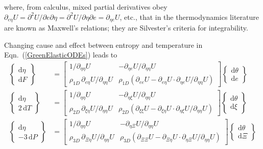 where, from calculus, mixed partial derivatives obey $\partial_{e\eta} U = \partial^2 U / \partial e \partial \eta = \partial^2 U / \partial \eta \partial e = \partial_{\eta e} U$, etc., that in the thermo\-dynamics literature are known as Maxwell's relations; they are Silvester's criteria for integrability.

Changing cause and effect between entropy and temperature in Eqn.~(\ref{GreenElasticODEs}) leads to
\begin{subequations}
    \label{HelmholtzElasticODEs}
    \begin{align}
    \left\{ \begin{matrix} \mathrm{d} \eta \\ 
    \mathrm{d} F \end{matrix} \right\} & = \begin{bmatrix}
    1/\partial_{\eta\eta} U & -\partial_{\eta e} U / 
    \partial_{\eta\eta} U \\
    \rho_{1D} \, \partial_{e\eta} U / \partial_{\eta\eta} U & \rho_{1D} ( \partial_{ee} U - \partial_{e\eta} U \!\cdot\! \partial_{\eta e} U / \partial_{\eta\eta} U ) \end{bmatrix} 
    \left\{ \begin{matrix} \mathrm{d} \theta \\
    \mathrm{d} e \end{matrix} \right\} \\
    \left\{ \begin{matrix} \mathrm{d} \eta \\ 
    2 \, \mathrm{d} T \end{matrix} \right\} & = \begin{bmatrix}
    1/\partial_{\eta\eta} U & -\partial_{\eta \xi} U / \partial_{\eta\eta} U \\
    \rho_{2D} \, \partial_{\xi\eta} U / \partial_{\eta\eta} U & \rho_{2D} ( \partial_{\xi\xi} U - \partial_{\xi\eta} U \!\cdot\! \partial_{\eta\xi} U / \partial_{\eta\eta} U ) \end{bmatrix} \left\{ \begin{matrix} \mathrm{d} \theta \\
    \mathrm{d} \xi \end{matrix} \right\} \label{HelmholtzMembrane} \\
    \left\{ \begin{matrix} \mathrm{d} \eta \\ 
    -3 \, \mathrm{d} P \end{matrix} \right\} & = \begin{bmatrix}
    1/\partial_{\eta\eta} U & -\partial_{\eta \Xi} U / \partial_{\eta\eta} U \\
    \rho_{3D} \, \partial_{\Xi\eta} U / \partial_{\eta\eta} U & \rho_{3D} ( \partial_{\Xi\Xi} U - \partial_{\Xi\eta} U \!\cdot\! \partial_{\eta\Xi} U / \partial_{\eta\eta} U ) \end{bmatrix} \left\{ \begin{matrix} \mathrm{d} \theta \\
    \mathrm{d} \Xi \end{matrix} \right\}
    \end{align}
\end{subequations}
